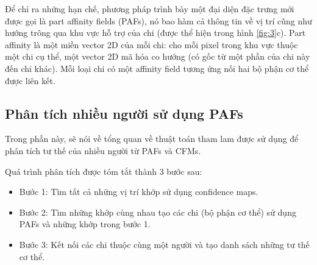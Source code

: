 Để chỉ ra những hạn chế, phương pháp trình bày một đại diện đặc trưng mới được gọi là part affinity fields (PAFs), nó bao hàm cả thông tin về vị trí cũng như hướng trông qua khu vực hỗ trợ của chi (được thể hiện trong hình \ref{fig:3}c). Part affinity là một miền vector 2D của mỗi chi: cho mỗi pixel trong khu vực thuộc một chi cụ thể, một vector 2D mã hóa co hướng (có gốc từ một phần của chi này đến chi khác). Mỗi loại chi có một affinity field tương ứng nối hai bộ phận cơ thể được liên kết.

\subsection{Phân tích nhiều người sử dụng PAFs}
\label{ss:Multi-Person Parsing using PAFs}

Trong phần này, sẽ nói về tổng quan về thuật toán tham lam được sử dụng để phân tích tư thế của nhiều người từ PAFs và CFMs.

Quá trình phân tích được tóm tắt thành 3 bước sau:
\begin{itemize}
\item Bước 1: Tìm tất cả những vị trí khớp sử dụng confidence maps.
\item Bước 2: Tìm những khớp cùng nhau tạo các chi (bộ phận cơ thể) sử dụng PAFs và những khớp trong bước 1.
\item Bước 3: Kết nối các chi thuộc cùng một người và tạo danh sách những tư thế cơ thể.
\end{itemize}

